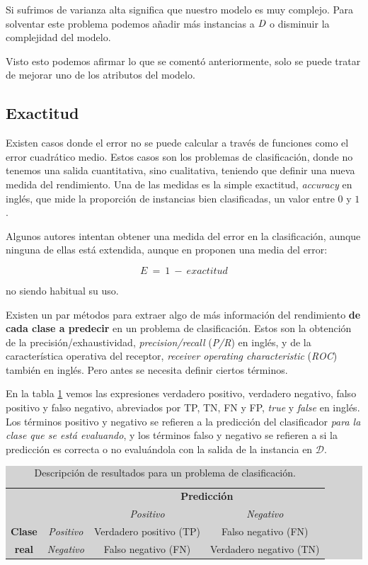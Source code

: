 Si sufrimos de varianza alta significa que nuestro modelo es muy complejo. Para solventar este problema podemos añadir más instancias a $\emph{D}$ o disminuir la complejidad del modelo.

Visto esto podemos afirmar lo que se comentó anteriormente, solo se puede tratar de mejorar uno de los atributos del modelo.

\subsection{Exactitud} \label{subsec:3.2.4}

Existen casos donde el error no se puede calcular a través de funciones como el error cuadrático medio. Estos casos son los problemas de clasificación, donde no tenemos una salida cuantitativa, sino cualitativa, teniendo que definir una nueva medida del rendimiento. Una de las medidas es la simple exactitud, \emph{accuracy} en inglés, que mide la proporción de instancias bien clasificadas, un valor entre $0$ y $1$.

Algunos autores intentan obtener una medida del error en la clasificación, aunque ninguna de ellas está extendida, aunque en \cite{richert2013building} proponen una media del error:

$$
E\:=\:1\:-\:exactitud
$$

\noindent
no siendo habitual su uso.

Existen un par métodos para extraer algo de más información del rendimiento \textbf{de cada clase a predecir} en un problema de clasificación. Estos son la obtención de la precisión/exhaustividad, \emph{precision/recall} (\emph{P/R}) en inglés, y de la característica operativa del receptor, \emph{receiver operating characteristic} (\emph{ROC}) también en inglés. Pero antes se necesita definir ciertos términos.

En la tabla \ref{table:3.2} vemos las expresiones verdadero positivo, verdadero negativo, falso positivo y falso negativo, abreviados por TP, TN, FN y FP, \emph{true} y \emph{false} en inglés. Los términos positivo y negativo se refieren a la predicción del clasificador \emph{para la clase que se está evaluando}, y los términos falso y negativo se refieren a si la predicción es correcta o no evaluándola con la salida de la instancia en $\mathcal{D}$.

\begin{table}[ht]
\centering
\colorbox{lightgray}{\begin{tabular}{*{4}{c}}
  & & \multicolumn{2}{c}{\textbf{Predicción}} \\
  & & \textit{Positivo} & \textit{Negativo} \\
  \textbf{Clase} & \textit{Positivo} & Verdadero positivo (TP) & Falso negativo (FN) \\
  \textbf{real} & \textit{Negativo} & Falso negativo (FN) & Verdadero negativo (TN)
\end{tabular}}
\caption{Descripción de resultados para un problema de clasificación.}
\label{table:3.2}
\end{table}

